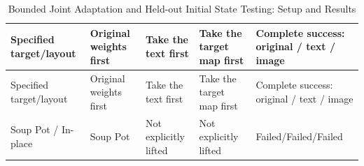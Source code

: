 \FloatBarrier\begingroup\small\setlength{\tabcolsep}{2.5pt}
\begin{longtable}[]{@{}
  >{\raggedright\arraybackslash}p{}
  >{\raggedright\arraybackslash}p{}
  >{\raggedright\arraybackslash}p{}
  >{\raggedright\arraybackslash}p{}
  >{\raggedright\arraybackslash}p{}@{}}
\caption{Bounded Joint Adaptation and Held-out Initial State Testing: Setup and Results}\label{tab:s14-9}\tabularnewline
\toprule\noalign{}
\begin{minipage}[b]{\linewidth}\raggedright
Specified target/layout
\end{minipage} & \begin{minipage}[b]{\linewidth}\raggedright
Original weights first
\end{minipage} & \begin{minipage}[b]{\linewidth}\raggedright
Take the text first
\end{minipage} & \begin{minipage}[b]{\linewidth}\raggedright
Take the target map first
\end{minipage} & \begin{minipage}[b]{\linewidth}\raggedright
Complete success: original / text / image
\end{minipage} \\
\midrule\noalign{}
\endfirsthead
\toprule\noalign{}
\begin{minipage}[b]{\linewidth}\raggedright
Specified target/layout
\end{minipage} & \begin{minipage}[b]{\linewidth}\raggedright
Original weights first
\end{minipage} & \begin{minipage}[b]{\linewidth}\raggedright
Take the text first
\end{minipage} & \begin{minipage}[b]{\linewidth}\raggedright
Take the target map first
\end{minipage} & \begin{minipage}[b]{\linewidth}\raggedright
Complete success: original / text / image
\end{minipage} \\
\midrule\noalign{}
\endhead
\bottomrule\noalign{}
\endlastfoot
Soup Pot / In-place & Soup Pot & Not explicitly lifted & Not explicitly lifted & Failed/Failed/Failed \\

\end{longtable}
